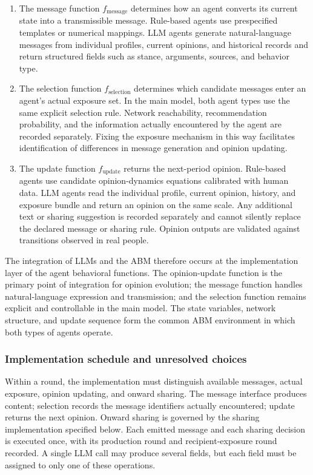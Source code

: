 \documentclass[11pt,a4paper]{article}
\begin{document}
\begin{enumerate}
\item The message function $f_{\text{message}}$ determines how an agent converts its current state into a transmissible message. Rule-based agents use prespecified templates or numerical mappings. LLM agents generate natural-language messages from individual profiles, current opinions, and historical records and return structured fields such as stance, arguments, sources, and behavior type.
\item The selection function $f_{\text{selection}}$ determines which candidate messages enter an agent's actual exposure set. In the main model, both agent types use the same explicit selection rule. Network reachability, recommendation probability, and the information actually encountered by the agent are recorded separately. Fixing the exposure mechanism in this way facilitates identification of differences in message generation and opinion updating.
\item The update function $f_{\text{update}}$ returns the next-period opinion. Rule-based agents use candidate opinion-dynamics equations calibrated with human data. LLM agents read the individual profile, current opinion, history, and exposure bundle and return an opinion on the same scale. Any additional text or sharing suggestion is recorded separately and cannot silently replace the declared message or sharing rule. Opinion outputs are validated against transitions observed in real people.
\end{enumerate}

The integration of LLMs and the ABM therefore occurs at the implementation layer of the agent behavioral functions. The opinion-update function is the primary point of integration for opinion evolution; the message function handles natural-language expression and transmission; and the selection function remains explicit and controllable in the main model. The state variables, network structure, and update sequence form the common ABM environment in which both types of agents operate.

\subsubsection{Implementation schedule and unresolved choices}

Within a round, the implementation must distinguish available messages, actual exposure, opinion updating, and onward sharing. The message interface produces content; selection records the message identifiers actually encountered; update returns the next opinion. Onward sharing is governed by the sharing implementation specified below. Each emitted message and each sharing decision is executed once, with its production round and recipient-exposure round recorded. A single LLM call may produce several fields, but each field must be assigned to only one of these operations.
\end{document}
